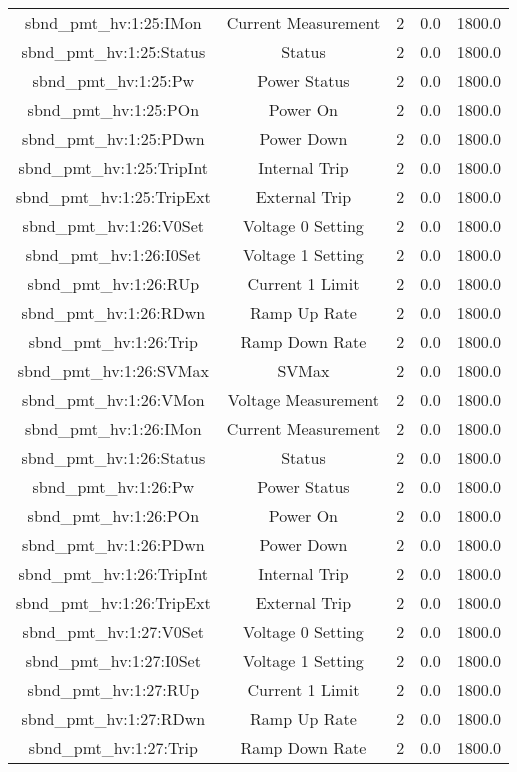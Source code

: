 \begin{table}[ptb]
\begin{tabular}{c | c c c c}
sbnd_pmt_hv:1:25:IMon & Current Measurement & 2 & 0.0 & 1800.0\\ 
sbnd_pmt_hv:1:25:Status & Status & 2 & 0.0 & 1800.0\\ 
sbnd_pmt_hv:1:25:Pw & Power Status & 2 & 0.0 & 1800.0\\ 
sbnd_pmt_hv:1:25:POn & Power On & 2 & 0.0 & 1800.0\\ 
sbnd_pmt_hv:1:25:PDwn & Power Down & 2 & 0.0 & 1800.0\\ 
sbnd_pmt_hv:1:25:TripInt & Internal Trip & 2 & 0.0 & 1800.0\\ 
sbnd_pmt_hv:1:25:TripExt & External Trip & 2 & 0.0 & 1800.0\\ 
sbnd_pmt_hv:1:26:V0Set & Voltage 0 Setting & 2 & 0.0 & 1800.0\\ 
sbnd_pmt_hv:1:26:I0Set & Voltage 1 Setting & 2 & 0.0 & 1800.0\\ 
sbnd_pmt_hv:1:26:RUp & Current 1 Limit & 2 & 0.0 & 1800.0\\ 
sbnd_pmt_hv:1:26:RDwn & Ramp Up Rate & 2 & 0.0 & 1800.0\\ 
sbnd_pmt_hv:1:26:Trip & Ramp Down Rate & 2 & 0.0 & 1800.0\\ 
sbnd_pmt_hv:1:26:SVMax & SVMax & 2 & 0.0 & 1800.0\\ 
sbnd_pmt_hv:1:26:VMon & Voltage Measurement & 2 & 0.0 & 1800.0\\ 
sbnd_pmt_hv:1:26:IMon & Current Measurement & 2 & 0.0 & 1800.0\\ 
sbnd_pmt_hv:1:26:Status & Status & 2 & 0.0 & 1800.0\\ 
sbnd_pmt_hv:1:26:Pw & Power Status & 2 & 0.0 & 1800.0\\ 
sbnd_pmt_hv:1:26:POn & Power On & 2 & 0.0 & 1800.0\\ 
sbnd_pmt_hv:1:26:PDwn & Power Down & 2 & 0.0 & 1800.0\\ 
sbnd_pmt_hv:1:26:TripInt & Internal Trip & 2 & 0.0 & 1800.0\\ 
sbnd_pmt_hv:1:26:TripExt & External Trip & 2 & 0.0 & 1800.0\\ 
sbnd_pmt_hv:1:27:V0Set & Voltage 0 Setting & 2 & 0.0 & 1800.0\\ 
sbnd_pmt_hv:1:27:I0Set & Voltage 1 Setting & 2 & 0.0 & 1800.0\\ 
sbnd_pmt_hv:1:27:RUp & Current 1 Limit & 2 & 0.0 & 1800.0\\ 
sbnd_pmt_hv:1:27:RDwn & Ramp Up Rate & 2 & 0.0 & 1800.0\\ 
sbnd_pmt_hv:1:27:Trip & Ramp Down Rate & 2 & 0.0 & 1800.0\\ 

\end{tabular}
\end{table}
